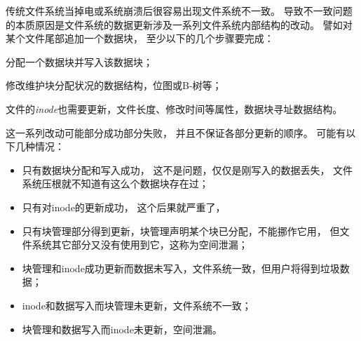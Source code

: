 传统文件系统当掉电或系统崩溃后很容易出现文件系统不一致。
导致不一致问题的本质原因是文件系统的数据更新涉及一系列文件系统内部结构的改动。
譬如对某个文件尾部追加一个数据块，
至少以下的几个步骤要完成：
\begin{enumerate*}[label=\itshape\alph*\upshape)]
  \item 分配一个数据块并写入该数据块；
  \item 修改维护块分配状况的数据结构，位图或B-树等；
  \item 文件的{\em inode}也需要更新，文件长度、修改时间等属性，数据块寻址数据结构。
\end{enumerate*}
这一系列改动可能部分成功部分失败，
并且不保证各部分更新的顺序。
可能有以下几种情况：
\begin{itemize}
  \item 只有数据块分配和写入成功，
    这不是问题，仅仅是刚写入的数据丢失，
    文件系统压根就不知道有这么个数据块存在过；
  \item 只有对inode的更新成功，
    这个后果就严重了，
  \item 只有块管理部分得到更新，块管理声明某个块已分配，不能挪作它用，
    但文件系统其它部分又没有使用到它，这称为空间泄漏；
  \item 块管理和inode成功更新而数据未写入，文件系统一致，但用户将得到垃圾数据；
  \item inode和数据写入而块管理未更新，文件系统不一致；
  \item 块管理和数据写入而inode未更新，空间泄漏。
\end{itemize}

